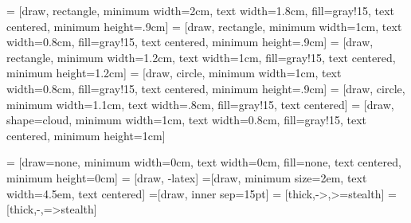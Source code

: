 
 = [draw, rectangle, minimum width=2cm, text width=1.8cm, fill=gray!15, 
  text centered,  minimum height=.9cm]
 = [draw, rectangle, minimum width=1cm, text width=0.8cm, fill=gray!15, 
  text centered,  minimum height=.9cm]
 = [draw, rectangle, minimum width=1.2cm, text width=1cm, fill=gray!15, 
  text centered,  minimum height=1.2cm]
 = [draw, circle, minimum width=1cm, text width=0.8cm, fill=gray!15, 
  text centered,  minimum height=.9cm]
 = [draw, circle, minimum width=1.1cm, text width=.8cm, fill=gray!15, 
  text centered]
 = [draw, shape=cloud, minimum width=1cm, text width=0.8cm, fill=gray!15, 
  text centered,  minimum height=1cm]

 = [draw=none, minimum width=0cm, text width=0cm, fill=none, 
  text centered,  minimum height=0cm]    
 = [draw, -latex]    
=[draw, minimum size=2em, text width=4.5em, text centered]
=[draw, inner sep=15pt]
 = [thick,->,>=stealth]
 = [thick,-,=>stealth]

\newcommand{\jumpline}[2]{
\path(#1.east) --(#2.west)  coordinate[pos=0.4](mid);
\draw[-latex] (#1.east) -| (mid) |- (#2.west);
}